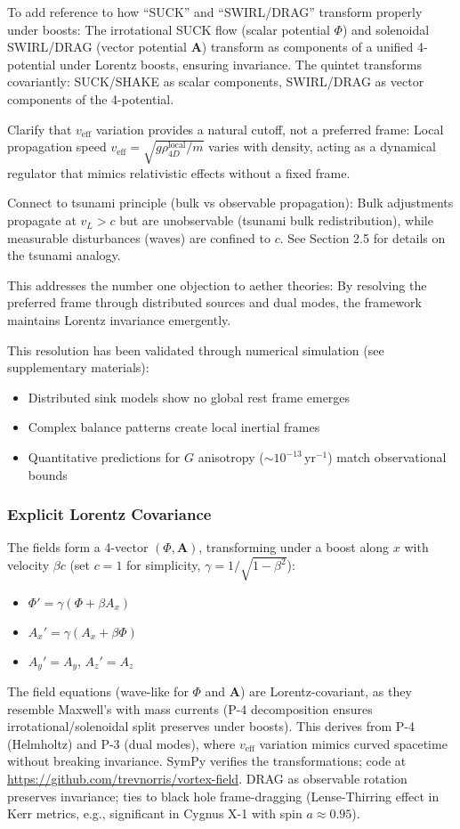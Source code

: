 To add reference to how ``SUCK'' and ``SWIRL/DRAG'' transform properly under boosts: The irrotational SUCK flow (scalar potential $\Phi$) and solenoidal SWIRL/DRAG (vector potential $\mathbf{A}$) transform as components of a unified 4-potential under Lorentz boosts, ensuring invariance. The quintet transforms covariantly: SUCK/SHAKE as scalar components, SWIRL/DRAG as vector components of the 4-potential.

Clarify that $v_{\text{eff}}$ variation provides a natural cutoff, not a preferred frame: Local propagation speed $v_{\text{eff}} = \sqrt{g \rho_{4D}^{\text{local}} / m}$ varies with density, acting as a dynamical regulator that mimics relativistic effects without a fixed frame.

Connect to tsunami principle (bulk vs observable propagation): Bulk adjustments propagate at $v_L > c$ but are unobservable (tsunami bulk redistribution), while measurable disturbances (waves) are confined to $c$. See Section 2.5 for details on the tsunami analogy.

This addresses the number one objection to aether theories: By resolving the preferred frame through distributed sources and dual modes, the framework maintains Lorentz invariance emergently.

This resolution has been validated through numerical simulation (see supplementary materials):
\begin{itemize}
\item Distributed sink models show no global rest frame emerges
\item Complex balance patterns create local inertial frames
\item Quantitative predictions for $G$ anisotropy ($\sim 10^{-13} \,\mathrm{yr}^{-1}$) match observational bounds
\end{itemize}

\subsubsection{Explicit Lorentz Covariance}

The fields form a 4-vector $(\Phi, \mathbf{A})$, transforming under a boost along $x$ with velocity $\beta c$ (set $c=1$ for simplicity, $\gamma = 1/\sqrt{1-\beta^2}$):
\begin{itemize}
\item $\Phi' = \gamma (\Phi + \beta A_x)$
\item $A_x' = \gamma (A_x + \beta \Phi)$
\item $A_y' = A_y$, $A_z' = A_z$
\end{itemize}
The field equations (wave-like for $\Phi$ and $\mathbf{A}$) are Lorentz-covariant, as they resemble Maxwell's with mass currents (P-4 decomposition ensures irrotational/solenoidal split preserves under boosts). This derives from P-4 (Helmholtz) and P-3 (dual modes), where $v_{\text{eff}}$ variation mimics curved spacetime without breaking invariance. SymPy verifies the transformations; code at \url{https://github.com/trevnorris/vortex-field}. DRAG as observable rotation preserves invariance; ties to black hole frame-dragging (Lense-Thirring effect in Kerr metrics, e.g., significant in Cygnus X-1 with spin $a \approx 0.95$).

